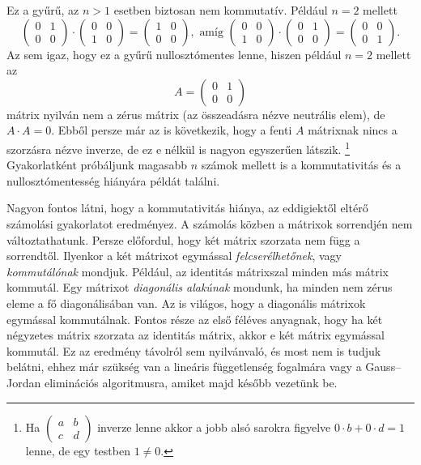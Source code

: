 \documentclass[9pt, a4paper, showtrims]{memoir}
\theoremstyle{plain}
\theoremstyle{remark}
\theoremstyle{definition}
\begin{document}
Ez a gyűrű, az $n>1$ esetben biztosan nem kommutatív. 
Például $n=2$ mellett
\[
    \begin{pmatrix}
        0&1\\
        0&0
    \end{pmatrix}
    \cdot
    \begin{pmatrix}
        0&0\\
        1&0
    \end{pmatrix}
    =
    \begin{pmatrix}
        1&0\\
        0&0
    \end{pmatrix},
    \text{ amíg }
    \begin{pmatrix}
        0&0\\
        1&0
    \end{pmatrix}
    \cdot
    \begin{pmatrix}
        0&1\\
        0&0
    \end{pmatrix}
    =
    \begin{pmatrix}
        0&0\\
        0&1
    \end{pmatrix}.
\]
Az sem igaz, hogy ez a gyűrű nullosztómentes lenne, hiszen például $n=2$ mellett az
\[
    A
    =
    \begin{pmatrix}
        0&1\\
        0&0
    \end{pmatrix}
\]
mátrix nyilván nem a zérus mátrix (az összeadásra nézve neutrális elem), 
de $A\cdot A=0$. 
Ebből persze már az is következik, hogy a fenti $A$ mátrixnak nincs a szorzásra nézve inverze,
de ez e nélkül is nagyon egyszerűen látszik.%
\footnote{
    Ha 
    \(
    \begin{pmatrix}
        a&b\\
        c&d
    \end{pmatrix}
    \)
    inverze lenne akkor a jobb alsó sarokra figyelve $0\cdot b +0\cdot d=1$ lenne, de egy testben $1\neq 0$.
}
Gyakorlatként próbáljunk magasabb $n$ számok mellett is a kommutativitás és a nullosztómentesség hiányára 
példát találni.

Nagyon fontos látni, hogy a kommutativitás hiánya, az eddigiektől eltérő számolási gyakorlatot eredményez.
A számolás közben a mátrixok sorrendjén nem változtathatunk. 
Persze előfordul, hogy két mátrix szorzata nem függ a sorrendtől. 
Ilyenkor a két mátrixot egymással \emph{felcserélhetőnek}, vagy \emph{kommutálónak} mondjuk.
Például, az identitás mátrixszal minden más mátrix kommutál.
Egy mátrixot \emph{diagonális alakúnak} mondunk, 
ha minden nem zérus eleme a fő diagonálisában van.
Az is világos, hogy a diagonális mátrixok egymással kommutálnak.
Fontos része az első féléves anyagnak, hogy ha két négyzetes mátrix szorzata az identitás mátrix,
akkor e két mátrix egymással kommutál.
Ez az eredmény távolról sem nyilvánvaló, és most nem is tudjuk belátni, ehhez már szükség van a lineáris függetlenség fogalmára vagy a Gauss--Jordan eliminációs algoritmusra, 
amiket majd később vezetünk be.\label{pg:kommutal}
\end{document}
